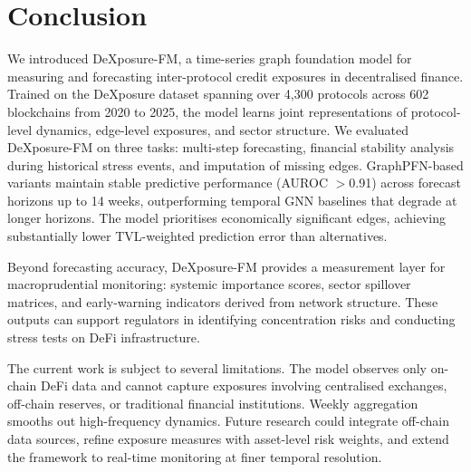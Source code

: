 \section{Conclusion}
\label{sec:conclusion}

We introduced DeXposure-FM, a time-series graph foundation model for measuring and forecasting inter-protocol credit exposures in decentralised finance. Trained on the DeXposure dataset spanning over 4,300 protocols across 602 blockchains from 2020 to 2025, the model learns joint representations of protocol-level dynamics, edge-level exposures, and sector structure. We evaluated DeXposure-FM on three tasks: multi-step forecasting, financial stability analysis during historical stress events, and imputation of missing edges. GraphPFN-based variants maintain stable predictive performance (AUROC $>$0.91) across forecast horizons up to 14 weeks, outperforming temporal GNN baselines that degrade at longer horizons. The model prioritises economically significant edges, achieving substantially lower TVL-weighted prediction error than alternatives.

Beyond forecasting accuracy, DeXposure-FM provides a measurement layer for macroprudential monitoring: systemic importance scores, sector spillover matrices, and early-warning indicators derived from network structure. These outputs can support regulators in identifying concentration risks and conducting stress tests on DeFi infrastructure.

The current work is subject to several limitations. The model observes only on-chain DeFi data and cannot capture exposures involving centralised exchanges, off-chain reserves, or traditional financial institutions. Weekly aggregation smooths out high-frequency dynamics. Future research could integrate off-chain data sources, refine exposure measures with asset-level risk weights, and extend the framework to real-time monitoring at finer temporal resolution.
